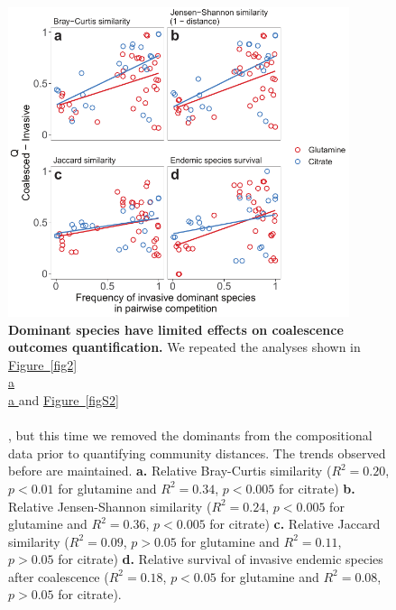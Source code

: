 \documentclass[a4paper,10pt]{article}
\newcommand{\figref}[2][]{%
  \hyperref[{#2}]{%
    Figure~\ref*{#2}%
    \ifx\\#1\\%
    \else
      #1%
    \fi
  }%
}
\begin{document}
\begin{figure}[!h]
\centering
\internallinenumbers
\includegraphics[width=10cm,keepaspectratio]{figs/figS3.pdf}
\caption{\textbf{Dominant species have limited effects on coalescence outcomes quantification.}
We repeated the analyses shown in \figref[a]{fig2} and \figref{figS2}, but this time we removed the
dominants from the compositional data prior to quantifying community distances.
The trends observed before are maintained.
\textbf{a.} Relative Bray-Curtis similarity
($R^2=0.20$, $p<0.01$ for glutamine and $R^2=0.34$, $p<0.005$ for citrate)
\textbf{b.} Relative Jensen-Shannon similarity 
($R^2=0.24$, $p<0.005$ for glutamine and $R^2=0.36$, $p<0.005$ for citrate)
\textbf{c.} Relative Jaccard similarity
($R^2=0.09$, $p>0.05$ for glutamine and $R^2=0.11$, $p>0.05$ for citrate)
\textbf{d.} Relative survival of invasive endemic species after coalescence
($R^2=0.18$, $p<0.05$ for glutamine and $R^2=0.08$, $p>0.05$ for citrate).}
\label{figS3}
\end{figure}

\clearpage
\end{document}

